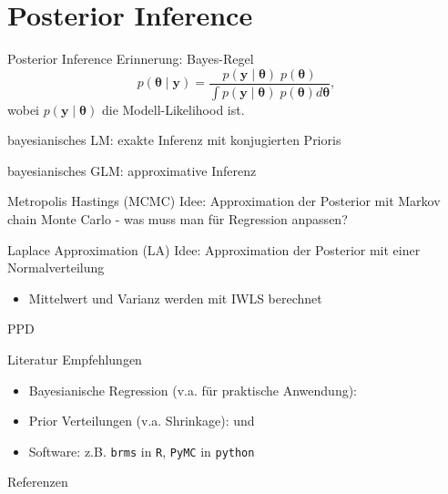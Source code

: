 \documentclass[
  ignorenonframetext,
  aspectratio=169,
]{beamer}
\newif\ifbibliography
\providecommand{\tightlist}{%
  \setlength{\itemsep}{0pt}\setlength{\parskip}{0pt}}
\newcommand{\by}{\bm{y}}
\newcommand{\btheta}{\bm{\theta}}
\begin{document}
\section{Posterior Inference}\label{posterior-inference}

\begin{frame}{Posterior Inference}
Erinnerung: Bayes-Regel
\[p(\btheta \mid \by) = \frac{p(\by \mid \btheta) \; p(\btheta)}{\int p(\by \mid \btheta) \; p(\btheta) d \btheta},\]
wobei \(p(\by \mid \btheta)\) die Modell-Likelihood ist.
\end{frame}

\begin{frame}{bayesianisches LM: exakte Inferenz mit konjugierten
Prioris}
\protect{}\label{bayesianisches-lm-exakte-inferenz-mit-konjugierten-prioris}
\end{frame}

\begin{frame}{bayesianisches GLM: approximative Inferenz}
\protect{}\label{bayesianisches-glm-approximative-inferenz}
\begin{block}{Metropolis Hastings (MCMC)}
\protect{}\label{metropolis-hastings-mcmc}
Idee: Approximation der Posterior mit Markov chain Monte Carlo - was
muss man für Regression anpassen?
\end{block}

\begin{block}{Laplace Approximation (LA)}
\protect{}\label{laplace-approximation-la}
Idee: Approximation der Posterior mit einer Normalverteilung

\begin{itemize}
\tightlist
\item
  Mittelwert und Varianz werden mit IWLS berechnet
\end{itemize}
\end{block}

\begin{block}{PPD}
\protect{}\label{ppd}
\end{block}
\end{frame}

\begin{frame}[fragile]{Literatur Empfehlungen}
\protect{}\label{literatur-empfehlungen}
\begin{itemize}
\tightlist
\item
  Bayesianische Regression (v.a. für praktische Anwendung):
  \textcite{gelman_bayesian_2013}
\item
  Prior Verteilungen (v.a. Shrinkage): \textcite{van_erp_shrinkage_2019}
  und \textcite{celeux_regularization_2012}
\item
  Software: z.B. \texttt{brms} in \texttt{R}, \texttt{PyMC} in
  \texttt{python}
\end{itemize}
\end{frame}

\begin{frame}[allowframebreaks]{Referenzen}
  \bibliographytrue
  \printbibliography[heading=none]
\end{frame}
\end{document}

